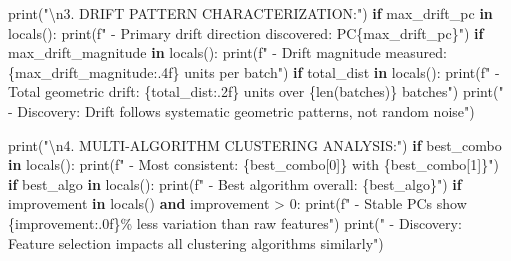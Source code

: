 \documentclass[
  letterpaper,
  DIV=11,
  numbers=noendperiod]{scrartcl}
\newenvironment{Shaded}{\begin{snugshade}}{\end{snugshade}}
\newcommand{\BuiltInTok}[1]{\textcolor[rgb]{0.00,0.23,0.31}{#1}}
\newcommand{\CharTok}[1]{\textcolor[rgb]{0.13,0.47,0.30}{#1}}
\newcommand{\ControlFlowTok}[1]{\textcolor[rgb]{0.00,0.23,0.31}{\textbf{#1}}}
\newcommand{\DecValTok}[1]{\textcolor[rgb]{0.68,0.00,0.00}{#1}}
\newcommand{\KeywordTok}[1]{\textcolor[rgb]{0.00,0.23,0.31}{\textbf{#1}}}
\newcommand{\NormalTok}[1]{\textcolor[rgb]{0.00,0.23,0.31}{#1}}
\newcommand{\OperatorTok}[1]{\textcolor[rgb]{0.37,0.37,0.37}{#1}}
\newcommand{\SpecialCharTok}[1]{\textcolor[rgb]{0.37,0.37,0.37}{#1}}
\newcommand{\SpecialStringTok}[1]{\textcolor[rgb]{0.13,0.47,0.30}{#1}}
\newcommand{\StringTok}[1]{\textcolor[rgb]{0.13,0.47,0.30}{#1}}
\renewenvironment{Shaded}{%
  \begin{tcolorbox}[%
    enhanced,%
    colback=codebg,%
    colframe=codebg,%
    borderline west={3pt}{0pt}{sectionblue},%
    fontupper=\small\ttfamily,%
    boxrule=0pt,%
    arc=0pt,%
    boxsep=5pt,%
    left=2mm,%
    right=2mm,%
    top=2mm,%
    bottom=2mm%
  ]%
}{%
  \end{tcolorbox}%
}
\begin{document}
\begin{Shaded}
\begin{Highlighting}[]
\BuiltInTok{print}\NormalTok{(}\StringTok{"}\CharTok{\textbackslash{}n}\StringTok{3. DRIFT PATTERN CHARACTERIZATION:"}\NormalTok{)}
\ControlFlowTok{if} \StringTok{\textquotesingle{}max\_drift\_pc\textquotesingle{}} \KeywordTok{in} \BuiltInTok{locals}\NormalTok{():}
    \BuiltInTok{print}\NormalTok{(}\SpecialStringTok{f"   {-} Primary drift direction discovered: PC}\SpecialCharTok{\{}\NormalTok{max\_drift\_pc}\SpecialCharTok{\}}\SpecialStringTok{"}\NormalTok{)}
    \ControlFlowTok{if} \StringTok{\textquotesingle{}max\_drift\_magnitude\textquotesingle{}} \KeywordTok{in} \BuiltInTok{locals}\NormalTok{():}
        \BuiltInTok{print}\NormalTok{(}\SpecialStringTok{f"   {-} Drift magnitude measured: }\SpecialCharTok{\{}\NormalTok{max\_drift\_magnitude}\SpecialCharTok{:.4f\}}\SpecialStringTok{ units per batch"}\NormalTok{)}
    \ControlFlowTok{if} \StringTok{\textquotesingle{}total\_dist\textquotesingle{}} \KeywordTok{in} \BuiltInTok{locals}\NormalTok{():}
        \BuiltInTok{print}\NormalTok{(}\SpecialStringTok{f"   {-} Total geometric drift: }\SpecialCharTok{\{}\NormalTok{total\_dist}\SpecialCharTok{:.2f\}}\SpecialStringTok{ units over }\SpecialCharTok{\{}\BuiltInTok{len}\NormalTok{(batches)}\SpecialCharTok{\}}\SpecialStringTok{ batches"}\NormalTok{)}
\BuiltInTok{print}\NormalTok{(}\StringTok{"   {-} Discovery: Drift follows systematic geometric patterns, not random noise"}\NormalTok{)}

\BuiltInTok{print}\NormalTok{(}\StringTok{"}\CharTok{\textbackslash{}n}\StringTok{4. MULTI{-}ALGORITHM CLUSTERING ANALYSIS:"}\NormalTok{)}
\ControlFlowTok{if} \StringTok{\textquotesingle{}best\_combo\textquotesingle{}} \KeywordTok{in} \BuiltInTok{locals}\NormalTok{():}
    \BuiltInTok{print}\NormalTok{(}\SpecialStringTok{f"   {-} Most consistent: }\SpecialCharTok{\{}\NormalTok{best\_combo[}\DecValTok{0}\NormalTok{]}\SpecialCharTok{\}}\SpecialStringTok{ with }\SpecialCharTok{\{}\NormalTok{best\_combo[}\DecValTok{1}\NormalTok{]}\SpecialCharTok{\}}\SpecialStringTok{"}\NormalTok{)}
    \ControlFlowTok{if} \StringTok{\textquotesingle{}best\_algo\textquotesingle{}} \KeywordTok{in} \BuiltInTok{locals}\NormalTok{():}
        \BuiltInTok{print}\NormalTok{(}\SpecialStringTok{f"   {-} Best algorithm overall: }\SpecialCharTok{\{}\NormalTok{best\_algo}\SpecialCharTok{\}}\SpecialStringTok{"}\NormalTok{)}
    \ControlFlowTok{if} \StringTok{\textquotesingle{}improvement\textquotesingle{}} \KeywordTok{in} \BuiltInTok{locals}\NormalTok{() }\KeywordTok{and}\NormalTok{ improvement }\OperatorTok{\textgreater{}} \DecValTok{0}\NormalTok{:}
        \BuiltInTok{print}\NormalTok{(}\SpecialStringTok{f"   {-} Stable PCs show }\SpecialCharTok{\{}\NormalTok{improvement}\SpecialCharTok{:.0f\}}\SpecialStringTok{\% less variation than raw features"}\NormalTok{)}
\BuiltInTok{print}\NormalTok{(}\StringTok{"   {-} Discovery: Feature selection impacts all clustering algorithms similarly"}\NormalTok{)}


\end{Highlighting}
\end{Shaded}
\end{document}
